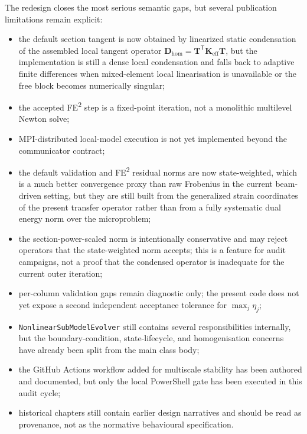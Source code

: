 The redesign closes the most serious semantic gaps, but several publication
limitations remain explicit:
\begin{itemize}
  \item the default section tangent is now obtained by linearized static
    condensation of the assembled local tangent operator
    \(\mathbf{D}_{\mathrm{hom}} = \mathbf{T}^{\mathsf T}
    \mathbf{K}_{\mathrm{eff}} \mathbf{T}\), but the implementation is still a
    dense local condensation and falls back to adaptive finite differences when
    mixed-element local linearisation is unavailable or the free block becomes
    numerically singular;
  \item the accepted FE\textsuperscript{2} step is a fixed-point iteration, not
    a monolithic multilevel Newton solve;
  \item MPI-distributed local-model execution is not yet implemented beyond the
    communicator contract;
  \item the default validation and FE\textsuperscript{2} residual norms are now
    state-weighted, which is a much better convergence proxy than raw
    Frobenius in the current beam-driven setting, but they are still built from
    the generalized strain coordinates of the present transfer operator rather
    than from a fully systematic dual energy norm over the microproblem;
  \item the section-power-scaled norm is intentionally conservative and may
    reject operators that the state-weighted norm accepts; this is a feature
    for audit campaigns, not a proof that the condensed operator is
    inadequate for the current outer iteration;
  \item per-column validation gaps remain diagnostic only; the present code does
    not yet expose a second independent acceptance tolerance for
    \(\max_j \eta_j\);
  \item \texttt{NonlinearSubModelEvolver} still contains several responsibilities
    internally, but the boundary-condition, state-lifecycle, and
    homogenisation concerns have already been split from the main class body;
  \item the GitHub Actions workflow added for multiscale stability has been
    authored and documented, but only the local PowerShell gate has been
    executed in this audit cycle;
  \item historical chapters still contain earlier design narratives and should
    be read as provenance, not as the normative behavioural specification.
\end{itemize}

